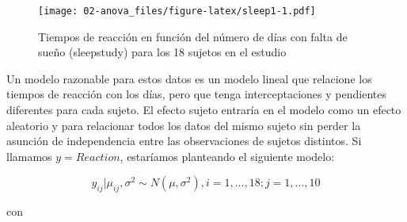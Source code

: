 \documentclass[
]{book}
\newenvironment{Shaded}{\begin{snugshade}}{\end{snugshade}}
\newcommand{\AttributeTok}[1]{\textcolor[rgb]{0.77,0.63,0.00}{#1}}
\newcommand{\CommentTok}[1]{\textcolor[rgb]{0.56,0.35,0.01}{\textit{#1}}}
\newcommand{\DecValTok}[1]{\textcolor[rgb]{0.00,0.00,0.81}{#1}}
\newcommand{\FloatTok}[1]{\textcolor[rgb]{0.00,0.00,0.81}{#1}}
\newcommand{\FunctionTok}[1]{\textcolor[rgb]{0.00,0.00,0.00}{#1}}
\newcommand{\NormalTok}[1]{#1}
\newcommand{\OtherTok}[1]{\textcolor[rgb]{0.56,0.35,0.01}{#1}}
\newcommand{\SpecialCharTok}[1]{\textcolor[rgb]{0.00,0.00,0.00}{#1}}
\newcommand{\StringTok}[1]{\textcolor[rgb]{0.31,0.60,0.02}{#1}}
\begin{document}
\begin{Shaded}
\end{Shaded}

\begin{figure}
\centering
\texttt{[image: 02-anova\_files/figure-latex/sleep1-1.pdf]}
\caption{\label{fig:sleep1}Tiempos de reacción en función del número de días con falta de sueño (sleepstudy) para los 18 sujetos en el estudio}
\end{figure}

Un modelo razonable para estos datos es un modelo lineal que relacione los tiempos de reacción con los días, pero que tenga interceptaciones y pendientes diferentes para cada sujeto. El efecto sujeto entraría en el modelo como un efecto aleatorio y para relacionar todos los datos del mismo sujeto sin perder la asunción de independencia entre las observaciones de sujetos distintos. Si llamamos \(y=Reaction\), estaríamos planteando el siguiente modelo:

\[ y_{ij}|\mu_{ij},\sigma^2 \sim N(\mu,\sigma^2), i=1,...,18; j=1, ...,10\]

con
\end{document}
